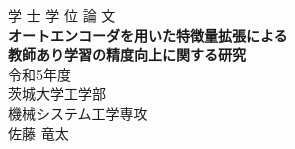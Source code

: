 \thispagestyle{empty}
\begin{center}
  \vspace*{20mm}
  {\LARGE 学 士 学 位 論 文\\}
  \vfill
  \textbf{{\huge オートエンコーダを用いた特徴量拡張による\\教師あり学習の精度向上に関する研究\\}}
  \vfill
  {\LARGE 令和5年度\\}
  \vfill
  {\LARGE 茨城大学工学部\\}
  \vfill
  {\LARGE 機械システム工学専攻\\}
  {\LARGE 佐藤 竜太\\}
  \vspace*{20mm}
\end{center}
\newpage

